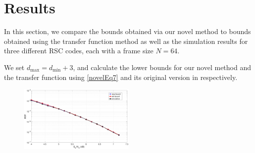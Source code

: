 \section{Results}
\label{sec5}
In this section, we compare the bounds obtained via our novel method to bounds obtained using the transfer function method as well as the simulation results for three different RSC codes, each with a frame size $N=64$. 

We set $d_{\text{max}}=d_{\text{min}}+3$, and calculate the lower bounds for our novel method and the transfer function using \eqref{novelEq7} and its original version in \cite{ref4} respectively.



\begin{figure}[htbp]
\centering
		\includegraphics[width=0.5\textwidth]{./Images/RSC_5_7_lower_weights.eps}
		\label{simFig1}
		\end{figure}
		
